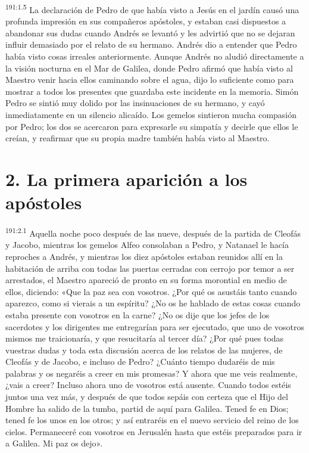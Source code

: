 \par 
\textsuperscript{191:1.5} La declaración de Pedro de que había visto a Jesús en el jardín causó una profunda impresión en sus compañeros apóstoles, y estaban casi dispuestos a abandonar sus dudas cuando Andrés se levantó y les advirtió que no se dejaran influir demasiado por el relato de su hermano. Andrés dio a entender que Pedro había visto cosas irreales anteriormente. Aunque Andrés no aludió directamente a la visión nocturna en el Mar de Galilea, donde Pedro afirmó que había visto al Maestro venir hacia ellos caminando sobre el agua, dijo lo suficiente como para mostrar a todos los presentes que guardaba este incidente en la memoria. Simón Pedro se sintió muy dolido por las insinuaciones de su hermano, y cayó inmediatamente en un silencio alicaído. Los gemelos sintieron mucha compasión por Pedro; los dos se acercaron para expresarle su simpatía y decirle que ellos le creían, y reafirmar que su propia madre también había visto al Maestro.

\section*{2. La primera aparición a los apóstoles}
\par 
\textsuperscript{191:2.1} Aquella noche poco después de las nueve, después de la partida de Cleofás y Jacobo, mientras los gemelos Alfeo consolaban a Pedro, y Natanael le hacía reproches a Andrés, y mientras los diez apóstoles estaban reunidos allí en la habitación de arriba con todas las puertas cerradas con cerrojo por temor a ser arrestados, el Maestro apareció de pronto en su forma morontial en medio de ellos, diciendo: «Que la paz sea con vosotros. ¿Por qué os asustáis tanto cuando aparezco, como si vierais a un espíritu? ¿No os he hablado de estas cosas cuando estaba presente con vosotros en la carne? ¿No os dije que los jefes de los sacerdotes y los dirigentes me entregarían para ser ejecutado, que uno de vosotros mismos me traicionaría, y que resucitaría al tercer día? ¿Por qué pues todas vuestras dudas y toda esta discusión acerca de los relatos de las mujeres, de Cleofás y de Jacobo, e incluso de Pedro? ¿Cuánto tiempo dudaréis de mis palabras y os negaréis a creer en mis promesas? Y ahora que me veis realmente, ¿vais a creer? Incluso ahora uno de vosotros está ausente. Cuando todos estéis juntos una vez más, y después de que todos sepáis con certeza que el Hijo del Hombre ha salido de la tumba, partid de aquí para Galilea. Tened fe en Dios; tened fe los unos en los otros; y así entraréis en el nuevo servicio del reino de los cielos. Permaneceré con vosotros en Jerusalén hasta que estéis preparados para ir a Galilea. Mi paz os dejo».

